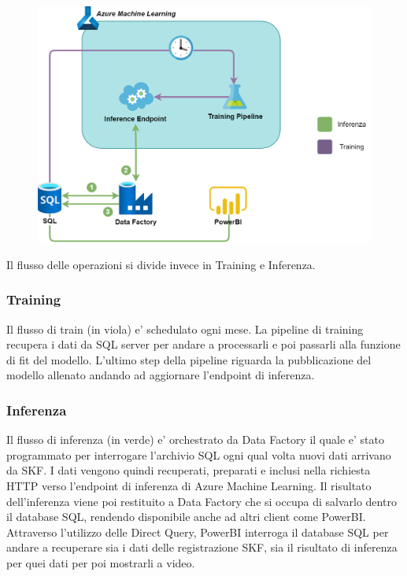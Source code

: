 \begin{figure}[t]
\includegraphics[width=14cm, scale=1]{images/deploy_scheme}
\centering
\end{figure}


Il flusso delle operazioni si divide invece in Training e Inferenza.

\subsubsection{Training}
Il flusso di train (in viola) e' schedulato ogni mese. La pipeline di training recupera i dati da SQL server per andare a processarli e poi passarli alla funzione di fit del modello. L'ultimo step della pipeline riguarda la pubblicazione del modello allenato andando ad aggiornare l'endpoint di inferenza.

\subsubsection{Inferenza}
Il flusso di inferenza (in verde) e' orchestrato da Data Factory il quale e' stato programmato per interrogare l'archivio SQL ogni qual volta nuovi dati arrivano da SKF. I dati vengono quindi recuperati, preparati e inclusi nella richiesta HTTP verso l'endpoint di inferenza di Azure Machine Learning. Il risultato dell'inferenza viene poi restituito a Data Factory che si occupa di salvarlo dentro il database SQL, rendendo disponibile anche ad altri client come PowerBI. Attraverso l'utilizzo delle Direct Query, PowerBI interroga il database SQL per andare a recuperare sia i dati delle registrazione SKF, sia il risultato di inferenza per quei dati per poi mostrarli a video.


